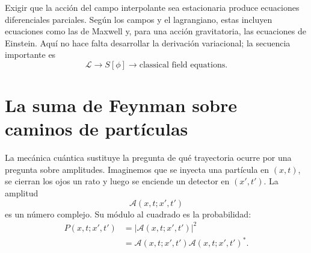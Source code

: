 \begin{classroomqa}
\end{classroomqa}

\begin{classroomqa}
\end{classroomqa}

Exigir que la acción del campo interpolante sea estacionaria produce ecuaciones diferenciales parciales. Según los campos y el lagrangiano, estas incluyen ecuaciones como las de Maxwell y, para una acción gravitatoria, las ecuaciones de Einstein. Aquí no hace falta desarrollar la derivación variacional; la secuencia importante es
\begin{equation}
\mathcal{L}
\longrightarrow
S[\phi]
\longrightarrow
\text{classical field equations}.
\end{equation}

\section{La suma de Feynman sobre caminos de partículas}

La mecánica cuántica sustituye la pregunta de qué trayectoria ocurre por una pregunta sobre amplitudes. Imaginemos que se inyecta una partícula en \((x,t)\), se cierran los ojos un rato y luego se enciende un detector en \((x',t')\). La amplitud
\begin{equation}
\mathcal{A}(x,t;x',t')
\end{equation}
es un número complejo. Su módulo al cuadrado es la probabilidad:
\begin{equation}
\begin{aligned}
P(x,t;x',t')
&=\left|\mathcal{A}(x,t;x',t')\right|^2\\
&=\mathcal{A}(x,t;x',t')
\mathcal{A}(x,t;x',t')^*.
\end{aligned}
\end{equation}

